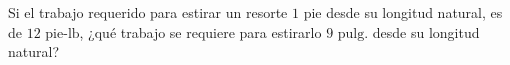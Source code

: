 \item Si el trabajo requerido para estirar un resorte $1 \text{ pie}$ desde su longitud natural, es de $12 \text{ pie-lb}$, ¿qué trabajo se requiere para estirarlo $9 \text{ pulg.}$ desde su longitud natural?
